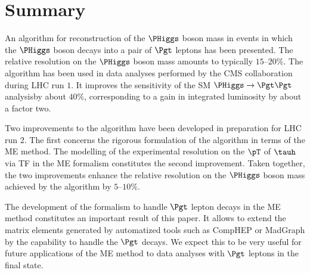 \section{Summary}
\label{sec:summary}

An algorithm for reconstruction of the $\PHiggs$ boson mass in events
in which the $\PHiggs$ boson decays into a pair of $\Pgt$ leptons has been
presented.
The relative resolution on the $\PHiggs$ boson mass amounts to typically
$15$--$20\%$.
The algorithm has been used in data analyses performed by the CMS
collaboration during LHC run $1$.
It improves the sensitivity of the SM $\PHiggs \to \Pgt\Pgt$ analysisby about $40\%$,
corresponding to a gain in integrated luminosity by about a factor two.

Two improvements to the algorithm have been developed in preparation
for LHC run $2$.
The first concerns the rigorous formulation of the
algorithm in terms of the ME method.
The modelling of the experimental resolution on the $\pT$ of $\tauh$ via TF in the ME
formalism constitutes the second improvement.
Taken together, the two improvements enhance the relative resolution on the $\PHiggs$ boson mass
achieved by the algorithm by $5$--$10\%$.

The development of the formalism to handle $\Pgt$ lepton decays
in the ME method constitutes an important result of this paper.
It allows to extend the matrix elements generated by automatized tools such as
CompHEP or MadGraph by the capability to handle the
$\Pgt$ decays. We expect this to be very useful for future
applications of the ME method to data analyses with $\Pgt$ leptons in
the final state. 
